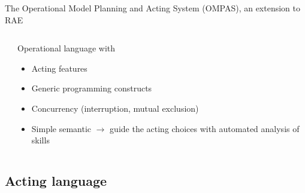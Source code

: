 \begin{frame}{The Operational Model Planning and Acting System (OMPAS), an extension to RAE}
\begin{columns}[t]
\begin{column}{0.5\textwidth}
        \end{column}
        \pause
        \begin{column}{0.5\textwidth}
        Operational language with
        \begin{itemize}
            \item Acting features
            \item Generic programming constructs
            \item Concurrency (interruption, mutual exclusion)
            \item Simple semantic $\rightarrow$ guide the acting choices with automated analysis of skills
        \end{itemize}
        \end{column}
    \end{columns}
\end{frame}

\subsection{Acting language}

    

